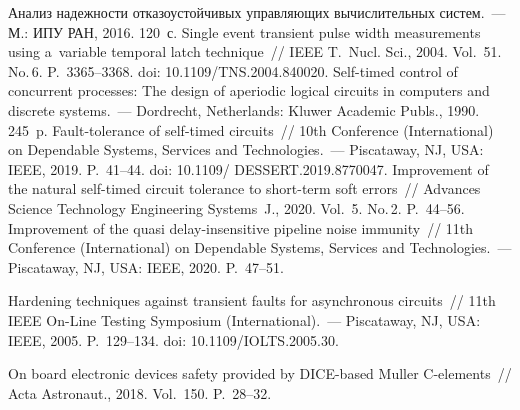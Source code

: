 \begin{multicols}{2}
{\small\frenchspacing
 {%
 \begin{thebibliography}{9}
   Анализ надежности 
отказоустойчивых управ\-ля\-ющих вы\-чис\-ли\-тель\-ных сис\-тем.~--- М.: ИПУ РАН, 2016. 120~с. 
Single event transient pulse width measurements using a~variable temporal latch technique~// IEEE 
T.~Nucl. Sci., 2004. Vol.~51. No.\,6. P.~3365--3368. doi: 10.1109/TNS.2004.840020.
   Self-timed control of 
concurrent processes: The design of aperiodic logical circuits in computers and discrete  
systems.~--- Dordrecht, Netherlands: Kluwer Academic Publs., 1990. 245~p.
   Fault-tolerance of self-timed circuits~// 10th Conference (International) on 
Dependable Systems, Services and Technologies.~--- Piscataway, NJ, USA: IEEE, 
2019. P.~41--44. doi: 10.1109/ DESSERT.2019.8770047.
   Improvement of the natural self-timed circuit tolerance to short-term soft 
errors~// Advances Science Technology Engineering Systems~J., 2020. Vol.~5. No.\,2. P.~44--56.
Improvement of the quasi delay-insensitive pipeline noise immunity~// 11th Conference 
(International)  on Dependable Systems, Services and Technologies.~--- Piscataway, 
NJ, USA: IEEE, 2020. P.~47--51.

 
   Hardening techniques against transient faults for 
asynchronous circuits~// 11th IEEE On-Line Testing Symposium (International).~--- Piscataway, 
NJ, USA: IEEE, 2005. P.~129--134. doi: 10.1109/IOLTS.2005.30.

 On board electronic devices safety provided by DICE-based 
Muller C-elements~// Acta Astronaut., 2018. Vol.~150. P.~28--32.
{

}
\end{thebibliography}

 }
 }

\end{multicols}

